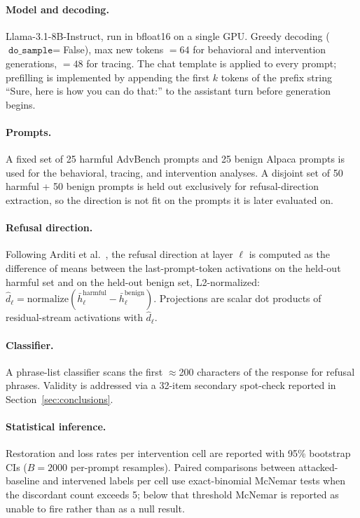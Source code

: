 \documentclass{article}
\begin{document}
\paragraph{Model and decoding.}
Llama-3.1-8B-Instruct, run in bfloat16 on a single GPU. Greedy
decoding ($\texttt{do\_sample}=$False), max new tokens $= 64$ for behavioral
and intervention generations, $= 48$ for tracing. The chat template is
applied to every prompt; prefilling is implemented by appending the first
$k$ tokens of the prefix string ``Sure, here is how you can do that:'' to
the assistant turn before generation begins.

\paragraph{Prompts.}
A fixed set of 25 harmful AdvBench prompts and 25 benign Alpaca prompts
is used for the behavioral, tracing, and intervention analyses. A
disjoint set of 50 harmful + 50 benign prompts is held out exclusively
for refusal-direction extraction, so the direction is not fit on the
prompts it is later evaluated on.

\paragraph{Refusal direction.}
Following Arditi et al.~\cite{arditi2024refusal}, the refusal direction
at layer $\ell$ is computed as the difference of means between the
last-prompt-token activations on the held-out harmful set and on the
held-out benign set, L2-normalized:
$\hat{d}_\ell = \mathrm{normalize}\left(\bar{h}^{\text{harmful}}_\ell -
\bar{h}^{\text{benign}}_\ell\right)$. Projections are scalar dot products
of residual-stream activations with $\hat{d}_\ell$.

\paragraph{Classifier.}
A phrase-list classifier scans the first $\approx$200 characters of the
response for refusal phrases. Validity is addressed via a 32-item
secondary spot-check reported in Section~\ref{sec:conclusions}.

\paragraph{Statistical inference.}
Restoration and loss rates per intervention cell are reported with 95\%
bootstrap CIs ($B=2000$ per-prompt resamples). Paired comparisons
between attacked-baseline and intervened labels per cell use exact-binomial
McNemar tests when the discordant count exceeds 5; below that threshold
McNemar is reported as unable to fire rather than as a null result.
\end{document}
